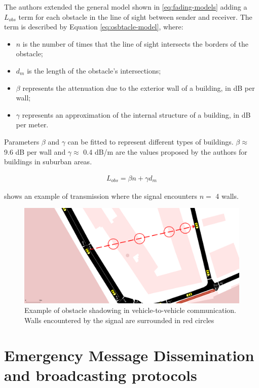 		The authors extended the general model shown in \ref{eq:fading-models} adding a $L_{obs}$ term for each obstacle in the line of sight between sender and receiver. The term is described by Equation \ref{eq:osbtacle-model}, where:
		\begin{itemize}
			\item $n$ is the number of times that the line of sight intersects the borders of the obstacle;
			\item $d_m$ is the length of the obstacle's intersections;
			\item $\beta$ represents the attenuation due to the exterior wall of a building, in dB per wall;
			\item $\gamma$ represents an approximation of the internal structure of a building, in dB per meter.
		\end{itemize}
		
		
		Parameters $\beta$ and $\gamma$ can be fitted to represent different types of buildings. $\beta \approx$ 9.6 dB per wall and $\gamma \approx$ 0.4 dB/m are the values proposed by the authors for buildings in suburban areas.
		
		\begin{gather}\label{eq:osbtacle-model}
			L_{obs} = \beta n + \gamma d_m
		\end{gather}
	
		 shows an example of transmission where the signal encounters $n =$ 4 walls. 
	
		\begin{figure}[H]
			\centering
			\includegraphics[width=\textwidth]{immagini/sumo-obstacle}
			\caption{Example of obstacle shadowing in vehicle-to-vehicle communication. Walls encountered by the signal are surrounded in red circles}
			\label{fig:sumo-obstacle}
		\end{figure}
	
	\section{Emergency Message Dissemination and broadcasting protocols}
